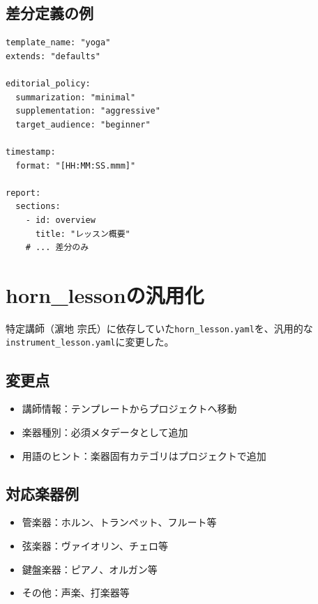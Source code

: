 \documentclass[a4paper,10pt,twocolumn]{ltjsarticle}
\begin{document}
\subsection{差分定義の例}

\begin{verbatim}
template_name: "yoga"
extends: "defaults"

editorial_policy:
  summarization: "minimal"
  supplementation: "aggressive"
  target_audience: "beginner"

timestamp:
  format: "[HH:MM:SS.mmm]"

report:
  sections:
    - id: overview
      title: "レッスン概要"
    # ... 差分のみ
\end{verbatim}

\section{horn\_lessonの汎用化}

特定講師（濵地 宗氏）に依存していた\texttt{horn\_lesson.yaml}を、汎用的な\texttt{instrument\_lesson.yaml}に変更した。

\subsection{変更点}

\begin{itemize}[noitemsep]
    \item 講師情報：テンプレートからプロジェクトへ移動
    \item 楽器種別：必須メタデータとして追加
    \item 用語のヒント：楽器固有カテゴリはプロジェクトで追加
\end{itemize}

\subsection{対応楽器例}

\begin{itemize}[noitemsep]
    \item 管楽器：ホルン、トランペット、フルート等
    \item 弦楽器：ヴァイオリン、チェロ等
    \item 鍵盤楽器：ピアノ、オルガン等
    \item その他：声楽、打楽器等
\end{itemize}
\end{document}

